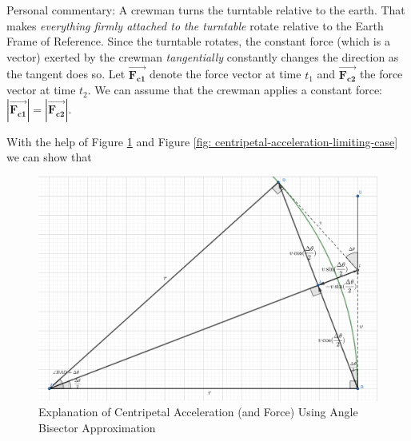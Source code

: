 \documentclass[a6paper]{article}
\newcommand{\perscom}[1]{
    {\footnotesize Personal commentary:  #1}
}
\newcommand{\vect}[1]{\pmb{\vec{#1}}}
\begin{document}
\perscom {
    A crewman turns the turntable relative to the earth. That makes \emph{everything firmly attached to the turntable} rotate relative to the Earth Frame of Reference. Since the turntable rotates, the constant force (which is a vector) exerted by the crewman \emph{tangentially} constantly changes the direction as the tangent does so. Let $\vect{F_{c1}}$ denote the force vector at time $t_1$ and $\vect{F_{c2}}$ the force vector at time $t_2$. We can assume that the crewman applies a constant force: $|\vect{F_{c1}}| = |\vect{F_{c2}}|$.
    
    With the help of Figure \ref{fig: centripetal-acceleration} and Figure \ref{fig: centripetal-acceleration-limiting-case} we can show that 
        \begin{figure}[h!]
            \centering
            \includegraphics[width=0.8\linewidth]{centripetal-acceleration.png}
            \caption{Explanation of Centripetal Acceleration (and Force) Using Angle Bisector Approximation}
            \label{fig: centripetal-acceleration}
        \end{figure}

}
\end{document}
